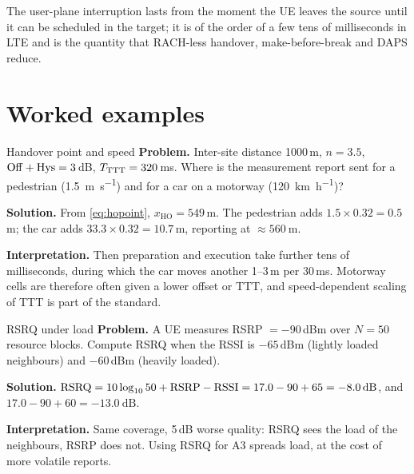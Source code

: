 \documentclass[11pt,a4paper]{article}
\begin{document}
\begin{acnfigure}
  \caption{X2-based handover in LTE (\cref{proc:x2}). Teal arrows: user-plane data forwarding and
  end marker.}
  \label{fig:x2}
\end{acnfigure}

The user-plane interruption lasts from the moment the UE leaves the source until it can be
scheduled in the target; it is of the order of a few tens of milliseconds in LTE and is the
quantity that RACH-less handover, make-before-break and DAPS reduce.

\section{Worked examples}

\begin{examplebox}{Handover point and speed}\label{ex:hopoint}
\textbf{Problem.} Inter-site distance 1000\,m, $n=3.5$, $\mathrm{Off}+\mathrm{Hys} = 3$\,dB, $T_{\mathrm{TTT}} = 320$\,ms.
Where is the measurement report sent for a pedestrian (\qty{1.5}{\metre\per\second}) and for a car on a
motorway (\qty{120}{\kilo\metre\per\hour})?

\textbf{Solution.} From \cref{eq:hopoint}, $x_{\mathrm{HO}} = 549$\,m. The pedestrian adds
$1.5\times0.32 = 0.5$\,m; the car adds $33.3\times0.32 = 10.7$\,m, reporting at $\approx\qty{560}{\metre}$.

\textbf{Interpretation.} Then preparation and execution take further tens of milliseconds, during
which the car moves another 1--3\,m per 30\,ms. Motorway cells are therefore often given a lower
offset or TTT, and speed-dependent scaling of TTT is part of the standard.
\end{examplebox}

\begin{examplebox}{RSRQ under load}\label{ex:rsrq}
\textbf{Problem.} A UE measures RSRP $=-90$\,dBm over $N=50$ resource blocks. Compute RSRQ when the
RSSI is $-65$\,dBm (lightly loaded neighbours) and $-60$\,dBm (heavily loaded).

\textbf{Solution.} $\RSRQ = 10\log_{10}50 + \RSRP - \RSSI = 17.0 - 90 + 65 = \qty{-8.0}{\dB}$, and
$17.0 - 90 + 60 = \qty{-13.0}{\dB}$.

\textbf{Interpretation.} Same coverage, 5\,dB worse quality: RSRQ sees the load of the
neighbours, RSRP does not. Using RSRQ for A3 spreads load, at the cost of more volatile reports.
\end{examplebox}
\end{document}
